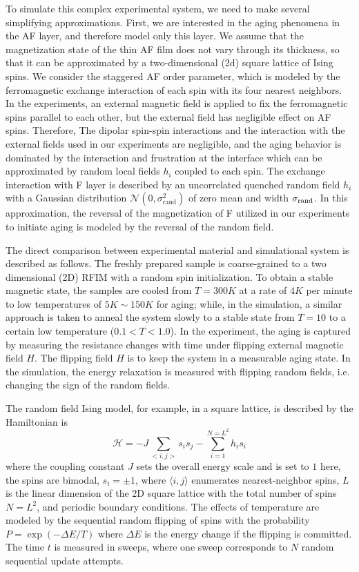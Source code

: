 To simulate this complex experimental system,  we need to make several simplifying approximations. First, we are interested in the aging phenomena in the AF layer, and therefore model only this layer. We assume that the magnetization state of the thin AF film does not vary through its thickness, so that it can be approximated by a two-dimensional (2d) square lattice of Ising spins. We consider the staggered AF order parameter, which is modeled by the ferromagnetic exchange interaction of each spin with its four nearest neighbors.  In the experiments,  an external magnetic field is applied to fix the ferromagnetic spins parallel to each other, but the external field has negligible effect on AF spins. Therefore, The dipolar spin-spin interactions and the interaction with the  external fields used in our experiments are negligible, and the aging behavior is dominated by the interaction and frustration at the interface which can be approximated by random local fields $h_i$ coupled to each spin. The exchange interaction with F layer is described by an uncorrelated quenched random field $h_i$ with a Gaussian distribution $\mathcal{N}(0,\sigma_{\text{rand}}^{2})$ of zero mean and width $\sigma_{{\rm rand}}$. 
In this approximation, the reversal of the magnetization of F utilized in our experiments to initiate aging is modeled by the reversal of the random field.

The direct comparison between experimental material and simulational system is described as follows. The freshly prepared sample is coarse-grained to a two dimensional (2D) RFIM with a random spin initialization.  To obtain a stable magnetic state, the samples are cooled from $T=300K$ at a rate of $4K$ per minute to  low temperatures of $5K \sim 150K$ for aging; while, in the simulation, a similar approach is taken to anneal the system slowly to a stable state from $T=10$ to a certain low temperature ($0.1<T<1.0$). In the experiment, the aging is captured by measuring the resistance changes with time under flipping external magnetic field $H$. The flipping field $H$ is to keep the system in a measurable aging state. In the simulation, the energy relaxation is measured with flipping random fields, i.e. changing the sign of the random fields.

The random field Ising model, for example, in a square lattice, is described by the Hamiltonian is
\begin{equation}\label{energy}
\mathcal{H}=-J\sum_{<i,j>}s_{i}s_{j}-\sum_{i=1}^{N=L^{2}}h_{i}s_{i}
\end{equation}
where the coupling constant $J$ sets the overall energy scale and
is set to $1$ here, the spins are bimodal, $s_{i}=\pm1$, where $
\langle i,j \rangle$
enumerates nearest-neighbor spins,  $L$ is the linear dimension of the 2D square lattice with the total number of spins $N=L^{2}$, and periodic boundary conditions. The effects of temperature are modeled by the sequential random flipping of spins with the probability $P=\exp(-\Delta E/T)$ where $\Delta E$ is the energy change if the flipping is committed. The time $t$ is measured in sweeps, where one sweep corresponds to $N$ random sequential update attempts.  

